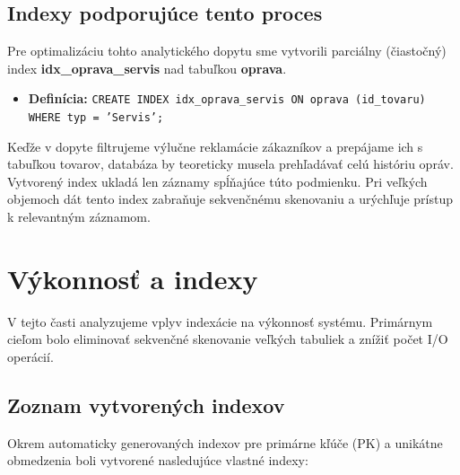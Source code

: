 \documentclass[11pt, a4paper]{article}
\begin{document}
\subsection{Indexy podporujúce tento proces}

Pre optimalizáciu tohto analytického dopytu sme vytvorili parciálny (čiastočný) index \textbf{idx\_oprava\_servis} nad tabuľkou \textbf{oprava}. 

\begin{itemize}
    \item \textbf{Definícia:} \texttt{CREATE INDEX idx\_oprava\_servis ON oprava (id\_tovaru) WHERE typ = 'Servis';}
\end{itemize}

Keďže v dopyte filtrujeme výlučne reklamácie zákazníkov a prepájame ich s tabuľkou tovarov, databáza by teoreticky musela prehľadávať celú históriu opráv. Vytvorený index ukladá len záznamy spĺňajúce túto podmienku. Pri veľkých objemoch dát tento index zabraňuje sekvenčnému skenovaniu a urýchľuje prístup k relevantným záznamom.


\newpage
\section{Výkonnosť a indexy}
\label{sec:index}
V tejto časti analyzujeme vplyv indexácie na výkonnosť systému. Primárnym cieľom bolo eliminovať sekvenčné skenovanie veľkých tabuliek a znížiť počet I/O operácií.

\subsection{Zoznam vytvorených indexov}
Okrem automaticky generovaných indexov pre primárne kľúče (PK) a unikátne obmedzenia boli vytvorené nasledujúce vlastné indexy:
\end{document}
